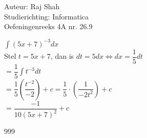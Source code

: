 \documentclass[a4paper]{article}
\begin{document}
  
\noindent \large Auteur: Raj Shah \\
\noindent \large Studierichting: Informatica\\
\noindent \large Oefeningenreeks 4A nr. 26.9 \\

\medskip

\normalsize

$\displaystyle\int (5x+7)^{-3} dx$\\

Stel $t = 5x+7$, dan is $dt = 5 dx \Leftrightarrow dx = \dfrac{1}{5}dt$\\

$ = \dfrac{1}{5} \displaystyle\int t^{-3}dt$\\

$ = \dfrac{1}{5} \left(\dfrac{t^{-2}}{-2}\right) + c = \dfrac{1}{5} \cdot \left(\dfrac{1}{-2t^2}\right) + c$\\

$ = \dfrac{-1}{10(5x+7)^2} + c $


\begin{thebibliography}{999}
\end{thebibliography}
\end{document}
